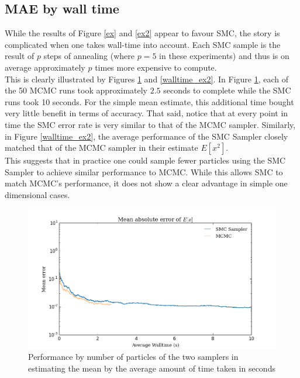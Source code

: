 \documentclass[12pt]{elsarticle}
\begin{document}
\subsection*{MAE by wall time}

While the results of Figure \ref{ex} and \ref{ex2} appear to favour SMC, the story is complicated when one takes wall-time into account. Each SMC sample is the result of $p$ steps of annealing (where $p=5$ in these experiments) and thus is on average approximately $p$ times more expensive to compute. \\

This is clearly illustrated by Figures \ref{walltime_ex} and  \ref{walltime_ex2}. In Figure \ref{walltime_ex}, each of the 50 MCMC runs took approximately $2.5$ seconds to complete while the SMC runs took 10 seconds. For the simple mean estimate, this additional time bought very little benefit in terms of accuracy. That said, notice that at every point in time the SMC error rate is very similar to that of the MCMC sampler. Similarly, in Figure \ref{walltime_ex2}, the average performance of the SMC Sampler closely matched that of the MCMC sampler in their estimate $E[x^2]$. \\

This suggests that in practice one could sample fewer particles using the SMC Sampler to achieve similar performance to MCMC. While this allows SMC to match MCMC's performance, it does not show a clear advantage in simple one dimensional cases.


\begin{figure}[htbp]
\begin{center}
\includegraphics[width = \textwidth]{plots/E_X_walltime.png}
\caption{Performance by number of particles of the two samplers in estimating the mean by the average amount of time taken in seconds}
\label{walltime_ex}
\end{center}
\end{figure}
\end{document}
